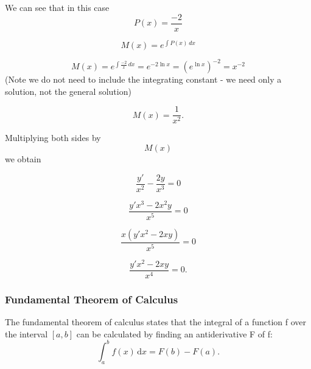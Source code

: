 \documentclass{beamer}
\begin{document}
			\begin{frame}
		We can see that in this case \[P(x) = \frac{-2}{x}\]
		
		\[ M(x)=e^{\int P(x)\,dx}\]
		
		\[ M(x)=e^{\int \frac{-2}{x}\,dx} = e^{-2 \ln x} = {(e^{\ln x})}^{-2} = x^{-2} \] (Note we do not need to include the integrating constant - we need only a solution, not the general solution)
		
		\[ M(x)=\frac{1}{x^2}.\]
			\end{frame}
			\begin{frame}
		Multiplying both sides by \[M(x)\] we obtain
		
		\[\frac{y'}{x^2} - \frac{2y}{x^3} = 0\]
		
		\[\frac{y'x^3 - 2x^2y}{x^5} = 0\]
		
		\[\frac{x(y'x^2 - 2xy)}{x^5} = 0\]
		
		\[\frac{y'x^2 - 2xy}{x^4} = 0.\]
		
		
			\end{frame}
			\begin{frame}
		
		\frametitle{Fundamental Theorem of Calculus}
		The fundamental theorem of calculus states that the integral of a function f over the interval $[a, b]$ can be calculated by finding an antiderivative F of f:
		\[\int_a^b f(x)\,\mathrm dx = F(b) - F(a).\]
			\end{frame}
\end{document}
